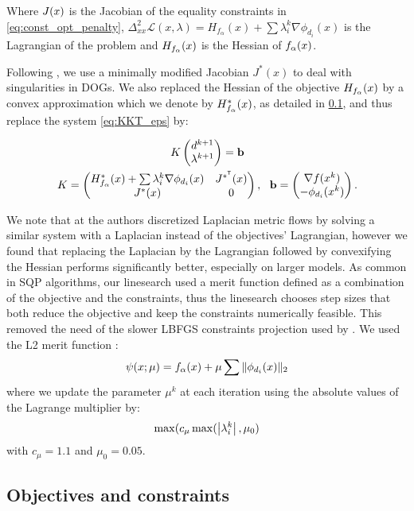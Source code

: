 Where $J(x)$ is the Jacobian of the equality constraints in \eqref{eq:const_opt_penalty}, $\Delta^2_{xx}\mathcal{L}(x,\lambda) = H_{f_\alpha}(x)+\sum\lambda_i^{k} \nabla \phi_{d_i}(x)$ is the Lagrangian of the problem and $H_{f_\alpha}(x)$ is the Hessian of $f_\alpha(x)$.

Following \cite{rabi2018shape}, we use a minimally modified Jacobian $J^*(x)$ to deal with singularities in DOGs. We also replaced the Hessian of the objective $H_{f_\alpha}(x)$ by a convex approximation which we denote by $H^*_{f_\alpha}(x)$, as detailed in \ref{sec:dog_obj}, and thus replace the system \eqref{eq:KKT_eps} by:

\begin{equation} \label{eq:KKT_us}
\begin{gathered}
{K} \begin{pmatrix} d^{k+1} \\ \lambda^{k+1} \end{pmatrix}=\mathbf{b} \\
{K}=\begin{pmatrix}
{ H^*_{f_\alpha}(x)+\sum\lambda_i^{k} \nabla \phi_{d_i}(\x)} & {J^{*^\tr}(x)}\\
{J^*(x)} &  0 \\
\end{pmatrix}, \ \ 
\mathbf{b}=\begin{pmatrix}
{\nabla f(x^k)} \\ 
-\phi_{d_i}(x^k)\\
\end{pmatrix}.
\end{gathered}
\end{equation}

We note that at \cite{rabi2018shape} the authors discretized Laplacian metric flows by solving a similar system with a Laplacian instead of the objectives' Lagrangian, however we found that replacing the Laplacian by the Lagrangian followed by convexifying the Hessian performs significantly better, especially on larger models. As common in SQP algorithms, our linesearch used a merit function defined as a combination of the objective and the constraints, thus the linesearch chooses step sizes that both reduce the objective and keep the constraints numerically feasible. This removed the need of the slower LBFGS constraints projection used by \cite{rabi18,rabi2018shape}. We used the L2 merit function \cite{nocedal}:
\begin{equation}
\psi(x;\mu) = f_\alpha(x)+\mu\sum\|\phi_{d_i}(x)\|_2
\end{equation}
where we update the parameter $\mu^k$ at each iteration using the absolute values of the Lagrange multiplier by:
\begin{equation}
\max(c_\mu \max(\left\vert\lambda_i^k\right\vert, \mu_0)	
\end{equation}
with $c_\mu = 1.1$ and $\mu_0 = 0.05$.

\subsection{Objectives and constraints} \label{sec:dog_obj}
